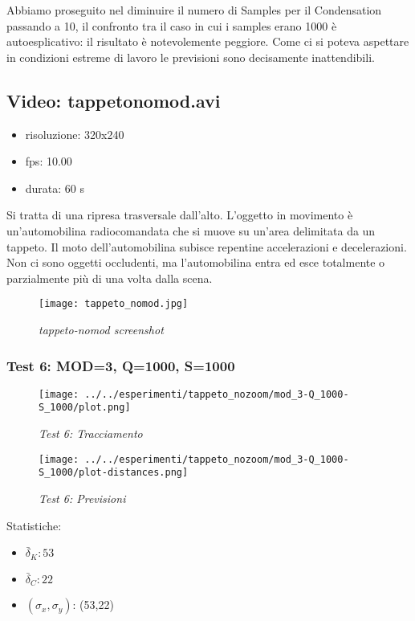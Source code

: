 Abbiamo proseguito nel diminuire il numero di Samples per il Condensation passando a 10, il confronto tra il caso in cui i samples erano 1000 è autoesplicativo: il risultato è notevolemente peggiore. Come ci si poteva aspettare in condizioni estreme di lavoro le previsioni sono decisamente inattendibili.

\newpage
\subsection{Video: tappetonomod.avi}

\begin{itemize}
\item risoluzione: 320x240
\item fps: 10.00
\item durata: 60 s
\end{itemize}

Si tratta di una ripresa trasversale dall'alto. L'oggetto in movimento è un'automobilina radiocomandata che si muove su un'area delimitata da un tappeto. Il moto dell'automobilina subisce repentine accelerazioni e decelerazioni. Non ci sono oggetti occludenti, ma l'automobilina entra ed esce totalmente o parzialmente più di una volta dalla scena.

\begin{figure}[hb]
\centering
	\texttt{[image: tappeto\_nomod.jpg]}
\caption{\textit{tappeto-nomod screenshot}}
\end{figure}

\newpage
\subsubsection{Test 6: MOD=3, Q=1000, S=1000}

\begin{figure}[hb]
\centering
\texttt{[image: ../../esperimenti/tappeto\_nozoom/mod\_3-Q\_1000-S\_1000/plot.png]}
\caption{\textit{Test 6: Tracciamento}}
\end{figure}

\begin{figure}[hb]
\centering
\texttt{[image: ../../esperimenti/tappeto\_nozoom/mod\_3-Q\_1000-S\_1000/plot-distances.png]}
\caption{\textit{Test 6: Previsioni}}
\end{figure}

Statistiche:
\begin{itemize}
\item \begin{math} \bar \delta_K: 53 \end{math}
\item \begin{math} \bar \delta_C: 22 \end{math}
\item \begin{math}(\sigma_x,\sigma_y)\end{math}: (53,22)
\end{itemize}

